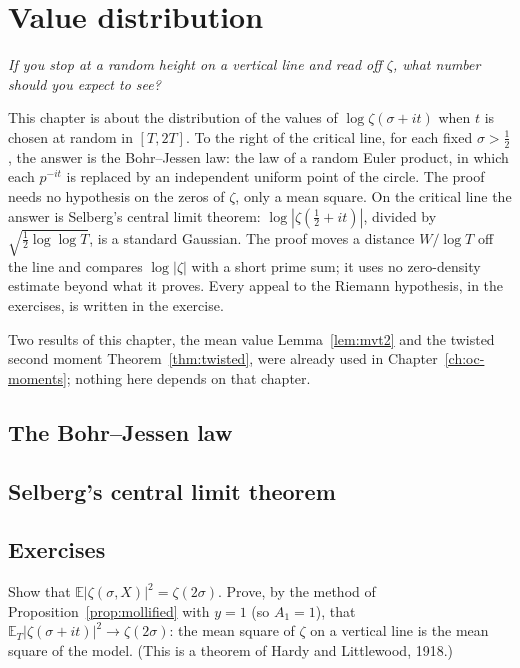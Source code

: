 \chapter{Value distribution}\label{ch:oc-values}

\begin{center}\itshape
If you stop at a random height on a vertical line and read off $\zeta$, what number should you expect to see?
\end{center}

This chapter is about the distribution of the values of $\log\zeta(\sigma+it)$ when $t$ is chosen at random in $[T,2T]$. To the right of the critical line, for each fixed $\sigma>\frac12$, the answer is the Bohr--Jessen law: the law of a random Euler product, in which each $p^{-it}$ is replaced by an independent uniform point of the circle. The proof needs no hypothesis on the zeros of $\zeta$, only a mean square. On the critical line the answer is Selberg's central limit theorem: $\log|\zeta(\frac12+it)|$, divided by $\sqrt{\frac12\log\log T}$, is a standard Gaussian. The proof moves a distance $W/\log T$ off the line and compares $\log|\zeta|$ with a short prime sum; it uses no zero-density estimate beyond what it proves. Every appeal to the Riemann hypothesis, in the exercises, is written in the exercise.

Two results of this chapter, the mean value Lemma~\ref{lem:mvt2} and the twisted second moment Theorem~\ref{thm:twisted}, were already used in Chapter~\ref{ch:oc-moments}; nothing here depends on that chapter.

\section{The Bohr--Jessen law}\label{ch:bohrjessen}



\section{Selberg's central limit theorem}\label{ch:selbergclt}



\section{Exercises}

\begin{exercise}[$\star$]\label{ex:meansquarezeta}
Show that $\mathbb E|\zeta(\sigma,X)|^2=\zeta(2\sigma)$. Prove, by the method of Proposition~\ref{prop:mollified} with $y=1$ (so $A_1=1$), that $\mathbb E_T|\zeta(\sigma+it)|^2\to\zeta(2\sigma)$: the mean square of $\zeta$ on a vertical line is the mean square of the model. (This is a theorem of Hardy and Littlewood, 1918.)
\end{exercise}

